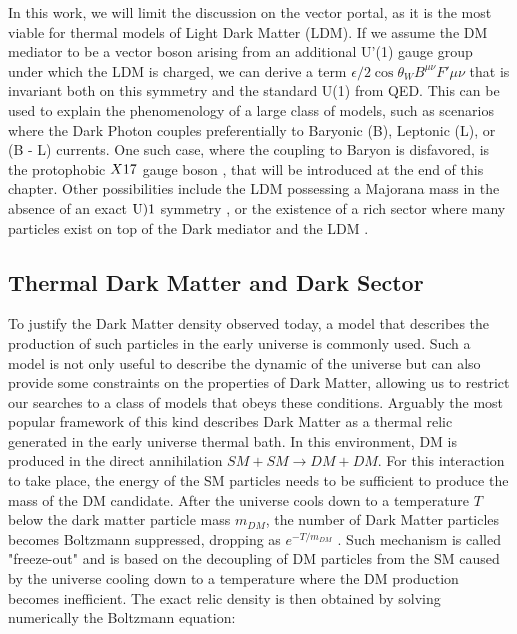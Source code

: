 In this work, we will limit the discussion on the vector portal, as it is the most viable for thermal models of Light Dark Matter (LDM). If we assume the DM mediator to be a vector boson arising from an additional U'(1) gauge group under which the LDM is charged, we can derive a term $\epsilon / 2 \cos{\theta_W} B^{\mu \nu} F'{\mu \nu}$ that is invariant both on this symmetry and the standard U(1) from QED. This can be used to explain the phenomenology of a large class of models, such as scenarios where the Dark Photon couples preferentially to Baryonic (B), Leptonic (L), or (B - L) currents. One such case, where the coupling to Baryon is disfavored, is the protophobic $X17$ gauge boson \cite{PhysRevD.95.035017}, that will be introduced at the end of this chapter. Other possibilities include the LDM possessing a Majorana mass in the absence of an exact $\rm{U)1}$ symmetry \cite{PhysRevD.93.063523}, or the existence of a rich sector where many particles exist on top of the Dark mediator and the LDM \cite{Morrissey_2014}.

\subsection{Thermal Dark Matter and Dark Sector}
\label{ch1:sec:thermal-dm}

To justify the Dark Matter density observed today, a model that describes the production of such particles in the early universe is commonly used. Such a model is not only useful to describe the dynamic of the universe but can also provide some constraints on the properties of Dark Matter, allowing us to restrict our searches to a class of models that obeys these conditions. Arguably the most popular framework of this kind describes Dark Matter as a thermal relic generated in the early universe thermal bath. In this environment, DM is produced in the direct annihilation $SM+SM \to DM+DM$. For this interaction to take place, the energy of the SM particles needs to be sufficient to produce the mass of the DM candidate. After the universe cools down to a temperature $T$ below the dark matter particle mass $m_{DM}$, the number of Dark Matter particles becomes Boltzmann suppressed, dropping as $e^{- T / m_{DM}}$ \cite{Feng:2010gw}. Such mechanism is called "freeze-out" and is based on the decoupling of DM particles from the SM caused by the universe cooling down to a temperature where the DM production becomes inefficient. The exact relic density is then obtained by solving numerically the Boltzmann equation:

